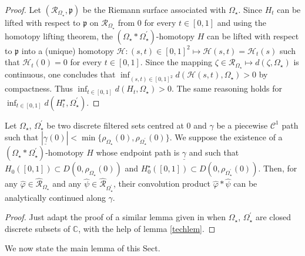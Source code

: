 \documentclass[11pt, english]{smfart}
\theoremstyle{definition}
\begin{document}
\begin{proof}
Let $(\mathscr{R}_{\Omega_\star}, \mathfrak{p})$ be the Riemann
surface associated with $\Omega_\star$. Since $H_t$ can be lifted 
with respect to $\mathfrak{p}$ on $\mathscr{R}_{\Omega_\star}$ from $0$ for every
$t \in [0,1]$ and using the homotopy lifting theorem, the ${(\Omega_\star \ast
  \Omega_\star^\prime)}$-homotopy   $H$ can be lifted with respect to
$\mathfrak{p}$ into a (unique) homotopy $\mathcal{H} :  (s,t) \in [0,1]^2
\mapsto  \mathcal{H}(s,t)=\mathcal{H}_t(s)$ such that
$\mathcal{H}_t(0) = 0$ for every $t \in [0,1]$.
 Since
the mapping $\zeta \in \mathscr{R}_{\Omega_\star} \mapsto d(\zeta,
\Omega_\star)$ is continuous, one concludes that $\inf_{(s,t) \in
  [0,1]^2}d(\mathcal{H}(s,t), \Omega_\star) >0$ by compactness. Thus
$\inf_{t \in [0,1]} d(H_t, \Omega_\star) >0$. The same reasoning holds
for $\inf_{t \in [0,1]} d(H_t^\star, \Omega_\star^\prime)$.
\end{proof}

\begin{lemm}\label{mainlem1forusuconv}
Let $\Omega_\star$, $\Omega_\star^\prime$ be two discrete filtered
sets centred at $0$ and  $\gamma$ be a piecewise $\mathcal{C}^1$
path such that $|\underline{\gamma}(0)| <
  \min \{\rho_{\Omega_\star}(0) , \rho_{\Omega_\star^\prime}(0)
  \}$. We suppose the existence of a 
${(\Omega_\star \ast \Omega_\star^\prime)}$-homotopy  $H$ whose endpoint
path is $\underline{\gamma}$ and such that ${H_0([0,1]) \subset
D(0, \rho_{\Omega_\star}(0))}$ and $H_0^\star([0,1]) \subset
D(0,\rho_{\Omega_\star^\prime}(0))$. Then, for any $\widehat{\varphi} \in
\widehat{\mathscr{R}}_{\Omega_\star}$ and any $\widehat{\psi} \in
\widehat{\mathscr{R}}_{\Omega_\star^\prime}$, their convolution product
 $\widehat{\varphi}
  \ast \widehat{\psi}$ can be analytically continued along $\gamma$.
\end{lemm}

\begin{proof}
Just adapt the proof of a similar lemma given in \cite{S012, S014} when $\Omega_\star$,
$\Omega_\star^\prime$ are closed discrete subsets of $\mathbb{C}$,
with the help of lemma \ref{techlem}.
\end{proof}

We now state the main lemma of this Sect.
\end{document}
